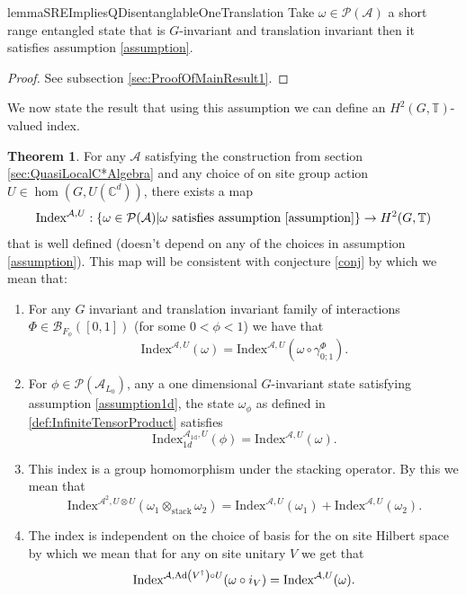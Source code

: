 \documentclass[12pt,a4paper,twoside]{article}
\let\originalleft\left
\let\originalright\right
\renewcommand{\left}{\mathopen{}\mathclose\bgroup\originalleft}
\renewcommand{\right}{\aftergroup\egroup\originalright}
\newcommand{\BB}{\mathcal B}
\newcommand{\PP}{\mathcal P}
\newcommand{\CC}{\mathbb C}
\newcommand{\TT}{\mathbb T}
\renewcommand{\AA}{\mathcal A}
\newcommand{\Ad}[1]{\textrm{Ad}\left(#1\right)}
\theoremstyle{definition}
\newtheorem{theorem}{Theorem}[section]
\numberwithin{equation}{section}
\begin{document}
\begin{restatable}{lemma}{SREImpliesQDisentanglableOneTranslation}\label{lem:SRE_Implies_QDisentanglable_OneTranslation}
	Take $\omega\in\PP(\AA)$ a short range entangled state that is $G$-invariant and translation invariant then it satisfies assumption \ref{assumption}.
\end{restatable}
\begin{proof}
	 See subsection \ref{sec:ProofOfMainResult1}.
\end{proof}
We now state the result that using this assumption we can define an $H^2(G,\TT)$-valued index.
\begin{theorem}\label{thrm:ExistenceFirstIndex}
	For any $\AA$ satisfying the construction from section \ref{sec:QuasiLocalC*Algebra} and any choice of on site group action $U\in\hom(G,U(\CC^d))$, there exists a map
	\begin{equation}
		\textrm{Index}^{\AA,U}:\{\omega\in\PP(\AA)|\omega\text{ satisfies assumption \ref{assumption}}\}\rightarrow H^2(G,\TT)
	\end{equation}
	that is well defined (doesn't depend on any of the choices in assumption \ref{assumption}). This map will be consistent with conjecture \ref{conj} by which we mean that:
	\begin{enumerate}
		\item For any $G$ invariant and translation invariant family of interactions $\Phi\in\BB_{F_{\phi}}([0,1])$ (for some $0<\phi<1$) we have that
		\begin{equation}
			\textrm{Index}^{\AA,U}(\omega)=\textrm{Index}^{\AA,U}(\omega\circ\gamma^{\Phi}_{0;1}).
		\end{equation}
		\item For $\phi\in\PP(\AA_{L_0})$, any a one dimensional $G$-invariant state satisfying assumption \ref{assumption1d}, the state $\omega_\phi$ as defined in \ref{def:InfiniteTensorProduct} satisfies
		\begin{equation}
			\textrm{Index}^{\AA_{\text{1d}},U}_{1d}(\phi)=\textrm{Index}^{\AA,U}(\omega).
		\end{equation}
		\item This index is a group homomorphism under the stacking operator. By this we mean that
		\begin{equation}
			\textrm{Index}^{\AA^2,U\otimes U}(\omega_1\otimes_{\text{stack}}\omega_2)=\textrm{Index}^{\AA,U}(\omega_1)+\textrm{Index}^{\AA,U}(\omega_2).
		\end{equation}
		\item The index is independent on the choice of basis for the on site Hilbert space by which we mean that for any on site unitary $V$ we get that
		\begin{equation}
			\textrm{Index}^{\AA,\Ad{V^\dagger}\circ U}(\omega\circ i_V)=\textrm{Index}^{\AA,U}(\omega).
		\end{equation}
	\end{enumerate}
\end{theorem}
\end{document}
